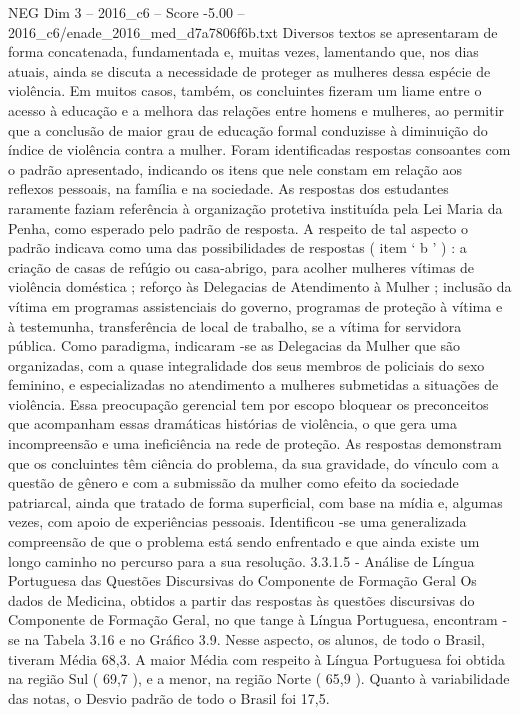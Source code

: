 \begin{textsample}{NEG Dim 3 – 2016\_c6 – Score -5.00 – 2016\_c6/enade\_2016\_med\_d7a7806f6b.txt}
Diversos textos se apresentaram de forma concatenada, fundamentada e, muitas vezes, lamentando que, nos dias atuais, ainda se discuta a necessidade de proteger as mulheres dessa espécie de violência.
Em muitos casos, também, os concluintes fizeram um liame entre o acesso à educação e a melhora das relações entre homens e mulheres, ao permitir que a conclusão de maior grau de educação formal conduzisse à diminuição do índice de violência contra a mulher.
Foram identificadas respostas consoantes com o padrão apresentado, indicando os itens que nele constam em relação aos reflexos pessoais, na família e na sociedade.
As respostas dos estudantes raramente faziam referência à organização protetiva instituída pela Lei Maria da Penha, como esperado pelo padrão de resposta.
A respeito de tal aspecto o padrão indicava como uma das possibilidades de respostas ( item ‘ b ’ ) : a criação de casas de refúgio ou casa-abrigo, para acolher mulheres vítimas de violência doméstica ; reforço às Delegacias de Atendimento à Mulher ; inclusão da vítima em programas assistenciais do governo, programas de proteção à vítima e à testemunha, transferência de local de trabalho, se a vítima for servidora pública.
Como paradigma, indicaram -se as Delegacias da Mulher que são organizadas, com a quase integralidade dos seus membros de policiais do sexo feminino, e especializadas no atendimento a mulheres submetidas a situações de violência.
Essa preocupação gerencial tem por escopo bloquear os preconceitos que acompanham essas dramáticas histórias de violência, o que gera uma incompreensão e uma ineficiência na rede de proteção.
As respostas demonstram que os concluintes têm ciência do problema, da sua gravidade, do vínculo com a questão de gênero e com a submissão da mulher como efeito da sociedade patriarcal, ainda que tratado de forma superficial, com base na mídia e, algumas vezes, com apoio de experiências pessoais.
Identificou -se uma generalizada compreensão de que o problema está sendo enfrentado e que ainda existe um longo caminho no percurso para a sua resolução. 3.3.1.5 - Análise de Língua Portuguesa das Questões Discursivas do Componente de Formação Geral Os dados de Medicina, obtidos a partir das respostas às questões discursivas do Componente de Formação Geral, no que tange à Língua Portuguesa, encontram -se na Tabela 3.16 e no Gráfico 3.9.
Nesse aspecto, os alunos, de todo o Brasil, tiveram Média 68,3.
A maior Média com respeito à Língua Portuguesa foi obtida na região Sul ( 69,7 ), e a menor, na região Norte ( 65,9 ).
Quanto à variabilidade das notas, o Desvio padrão de todo o Brasil foi 17,5.

\end{textsample}
